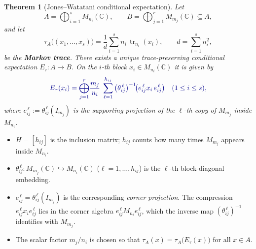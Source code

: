 \documentclass[11pt]{article}
\renewcommand{\paragraph}[1]{\vspace{1em}\noindent{\color{MyDarkBlue}\bfseries #1}}
\theoremstyle{mytheoremstyle}
\newtheorem{theorem}{Theorem}[section]
\theoremstyle{definition}
\theoremstyle{remark}
\newcommand{\tr}{\operatorname{tr}}
\begin{document}
\begin{theorem}[Jones–Watatani conditional expectation]\label{thm:JW-CE}
Let
\[
   A=\bigoplus_{i=1}^{s}M_{n_i}(\mathbb{C}), \qquad 
   B=\bigoplus_{j=1}^{r}M_{m_j}(\mathbb{C})\subseteq A,
\]
and let
\[
  \tau_A\!\bigl((x_1,\dots,x_s)\bigr)=\frac1d\sum_{i=1}^{s} n_i\,\tr_{n_i}(x_i),
  \qquad
  d=\sum_{i=1}^{s}n_i^{2},
\]
be the \textbf{Markov trace}.  
There exists a unique trace-preserving conditional expectation 
\(E_\tau:A\to B\).  
On the $i$-th block \(x_i\in M_{n_i}(\mathbb{C})\) it is given by
\begin{equation}\label{eq:JW-formula}
{\color{MyDarkBlue}
  E_\tau(x_i)=
  \bigoplus_{j=1}^{r}\! 
     \frac{m_j}{n_i}\; 
     \sum_{\ell=1}^{h_{ij}}
        {\bigl(\theta_{ij}^{\,\ell}\bigr)^{-1}\! 
        \bigl(e_{ij}^{\,\ell}x_i\,e_{ij}^{\,\ell}\bigr)}
  \quad(1\le i\le s),
}
\end{equation}
where \(e_{ij}^{\,\ell}:=\theta_{ij}^{\,\ell}(I_{m_j})\) is the supporting projection of the
$\ell$-th copy of \(M_{m_j}\) inside \(M_{n_i}\).
\end{theorem}

\paragraph{Notation at a glance.}
\begin{itemize}
  \item $H=[h_{ij}]$ is the inclusion matrix; $h_{ij}$ counts how many times
        \(M_{m_j}\) appears inside \(M_{n_i}\).
  \item \(\theta_{ij}^{\,\ell}:M_{m_j}(\mathbb{C})\hookrightarrow M_{n_i}(\mathbb{C})\)
        (\(\ell=1,\dots,h_{ij}\)) is the $\ell$-th block-diagonal embedding.
  \item \(e_{ij}^{\,\ell}= \theta_{ij}^{\,\ell}(I_{m_j})\) is the corresponding
        \textit{corner projection}. 
        The compression \(e_{ij}^{\,\ell}x_i e_{ij}^{\,\ell}\) lies in the corner
        algebra \(e_{ij}^{\,\ell}M_{n_i}e_{ij}^{\,\ell}\),
        which the inverse map \((\theta_{ij}^{\,\ell})^{-1}\) identifies with
        \(M_{m_j}\).
  \item The scalar factor \(m_j/n_i\) is chosen so that
        \(\tau_A(x)=\tau_A\!\bigl(E_\tau(x)\bigr)\) for all \(x\in A\).
\end{itemize}
\end{document}
